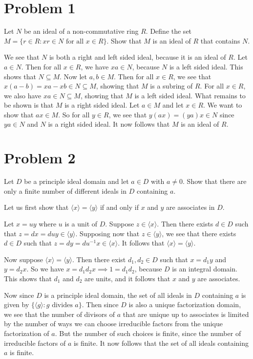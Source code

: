\documentclass{article}
\begin{document}
\newcommand{\Z}{\mathbb{Z}}

\section*{Problem 1}

Let $N$ be an ideal of a non-commutative ring $R$.  Define the set
$M=\{r\in R:\mbox{$xr\in N$ for all $x\in R$}\}$.  Show that
$M$ is an ideal of $R$ that contains $N$.

We see that $N$ is both a right and left sided ideal, because it
is an ideal of $R$.
Let $a\in N$.  Then for all $x\in R$, we have $xa\in N$, because
$N$ is a left sided ideal.  This shows that $N\subseteq M$.
Now let $a,b\in M$.  Then for all $x\in R$, we see that $x(a-b)=xa-xb\in N\subseteq M$,
showing that $M$ is a subring of $R$.
For all $x\in R$, we also have $xa\in N\subseteq M$, showing that $M$
is a left sided ideal.
What remains to be shown is that $M$ is a right sided ideal.
Let $a\in M$ and let $x\in R$.  We want to show that $ax\in M$.
So for all $y\in R$, we see that $y(ax)=(ya)x\in N$ since $ya\in N$
and $N$ is a right sided ideal.
It now follows that $M$ is an ideal of $R$.

\section*{Problem 2}

Let $D$ be a principle ideal domain and let $a\in D$ with $a\neq 0$.
Show that there are only a finite number of different ideals in $D$
containing $a$.

Let us first show that $\langle x\rangle=\langle y\rangle$ if and
only if $x$ and $y$ are associates in $D$.

Let $x=uy$ where $u$ is a unit of $D$.  Suppose $z\in\langle x\rangle$.
Then there exists $d\in D$ such that $z=dx=duy\in\langle y\rangle$.
Supposing now that $z\in\langle y\rangle$, we see that there exists
$d\in D$ such that $z=dy=du^{-1}x\in\langle x\rangle$.  It follows
that $\langle x\rangle=\langle y\rangle$.

Now suppose $\langle x\rangle=\langle y\rangle$.  Then there exist
$d_1,d_2\in D$ such that $x=d_1y$ and $y=d_2x$.  So we have
$x=d_1d_2x\implies 1=d_1d_2$, because $D$ is an integral domain.
This shows that $d_1$ and $d_2$ are units, and
it follows that $x$ and $y$ are associates.

Now since $D$ is a principle ideal domain, the set of all
ideals in $D$ containing $a$ is given by
$\{\langle g\rangle:\mbox{$g$ divides $a$}\}$.
Then since $D$ is also a unique factorization domain, we see
that the number of divisors of $a$ that are unique up to associates
is limited by the number of ways we can choose irreducible factors from
the unique factorization of $a$.
But the number of such choices is finite, since the number of irreducible
factors of $a$ is finite.  It now follows that the set of
all ideals containing $a$ is finite.
\end{document}
